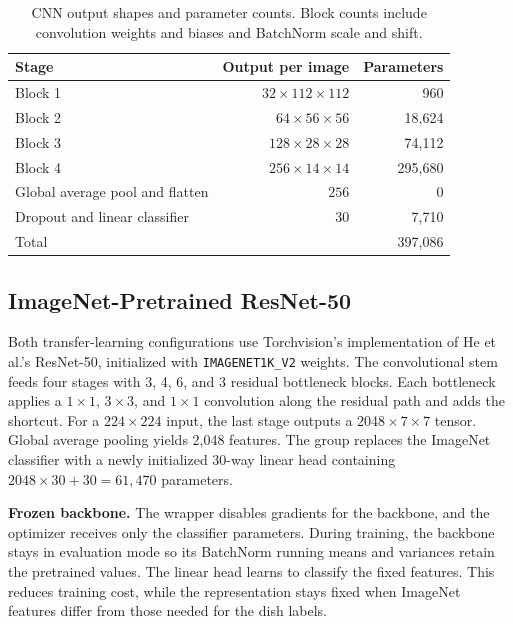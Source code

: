 \begin{table}[H]
    \centering
    \caption{CNN output shapes and parameter counts. Block counts include convolution weights and biases and BatchNorm scale and shift.}
    \label{tab:a2-cnn-stages}
    \begin{tabular}{lrr}
        \toprule
        Stage & Output per image & Parameters \\
        \midrule
        Block 1 & $32\times112\times112$ & 960 \\
        Block 2 & $64\times56\times56$ & 18,624 \\
        Block 3 & $128\times28\times28$ & 74,112 \\
        Block 4 & $256\times14\times14$ & 295,680 \\
        Global average pool and flatten & $256$ & 0 \\
        Dropout and linear classifier & $30$ & 7,710 \\
        \midrule
        Total & & 397,086 \\
        \bottomrule
    \end{tabular}
\end{table}

\clearpage
\subsection{ImageNet-Pretrained ResNet-50}
\label{sec:a2-resnet50}

Both transfer-learning configurations use Torchvision's implementation of He et al.'s ResNet-50, initialized with \texttt{IMAGENET1K\_V2} weights. The convolutional stem feeds four stages with 3, 4, 6, and 3 residual bottleneck blocks. Each bottleneck applies a $1\times1$, $3\times3$, and $1\times1$ convolution along the residual path and adds the shortcut. For a $224\times224$ input, the last stage outputs a $2048\times7\times7$ tensor. Global average pooling yields 2,048 features. The group replaces the ImageNet classifier with a newly initialized 30-way linear head containing $2048\times30+30=61{,}470$ parameters.

\textbf{Frozen backbone.} The wrapper disables gradients for the backbone, and the optimizer receives only the classifier parameters. During training, the backbone stays in evaluation mode so its BatchNorm running means and variances retain the pretrained values. The linear head learns to classify the fixed features. This reduces training cost, while the representation stays fixed when ImageNet features differ from those needed for the dish labels.

